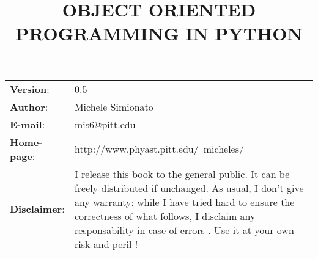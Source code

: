 \documentclass[10pt,english]{article}
\title{OBJECT ORIENTED PROGRAMMING IN PYTHON}
\author{}
\date{}
\newlength{\docinfowidth}
\newlength{\locallinewidth}
\begin{document}
\maketitle

\begin{center}
\begin{tabularx}{\docinfowidth}{lX}
\textbf{Version}: &
	0.5 \\
\textbf{Author}: &
	Michele Simionato \\
\textbf{E-mail}: &
	mis6@pitt.edu \\
\textbf{Home-page}: &
	http://www.phyast.pitt.edu/~micheles/ \\
\textbf{Disclaimer}: &
	I release this book to the general public. 
It can be freely distributed if unchanged.
As usual, I don't give any warranty: while I have tried hard to ensure the
correctness of what follows, I disclaim any responsability in case of
errors . Use it at your own risk and peril ! \\
\end{tabularx}
\end{center}

\setlength{\locallinewidth}{\linewidth}



\hypertarget{contents}{}
\end{document}
